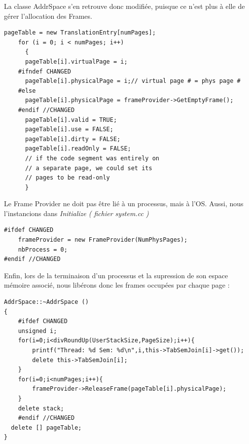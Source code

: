 \documentclass[a4paper,10pt]{article}
\begin{document}
\newpage
La classe AddrSpace s'en retrouve donc modifiée, puisque ce n'est plus à elle de gérer l'allocation des Frames.
\begin{lstlisting}[frame=single]
 pageTable = new TranslationEntry[numPages];
    for (i = 0; i < numPages; i++)
      {
	  pageTable[i].virtualPage = i;	
	#ifndef CHANGED
	  pageTable[i].physicalPage = i;// virtual page # = phys page #
	#else
	  pageTable[i].physicalPage = frameProvider->GetEmptyFrame();
	#endif //CHANGED
	  pageTable[i].valid = TRUE;
	  pageTable[i].use = FALSE;
	  pageTable[i].dirty = FALSE;
	  pageTable[i].readOnly = FALSE;
	  // if the code segment was entirely on 
	  // a separate page, we could set its 
	  // pages to be read-only
      }
\end{lstlisting}

Le Frame Provider ne doit pas être lié à un processus, mais à l'OS. Aussi, nous l'instancions dans \textit{Initialize  ( fichier system.cc )}

\begin{lstlisting}[frame=single]
 #ifdef CHANGED
    frameProvider = new FrameProvider(NumPhysPages);
    nbProcess = 0;
#endif //CHANGED
\end{lstlisting}

Enfin, lors de la terminaison d'un processus et la supression de son espace mémoire associé, nous libérons donc les frames occupées par chaque page :

\begin{lstlisting}[frame=single]
 AddrSpace::~AddrSpace ()
{
	#ifdef CHANGED
	unsigned i;
	for(i=0;i<divRoundUp(UserStackSize,PageSize);i++){
		printf("Thread: %d Sem: %d\n",i,this->TabSemJoin[i]->get());
		delete this->TabSemJoin[i];
	}
	for(i=0;i<numPages;i++){
		frameProvider->ReleaseFrame(pageTable[i].physicalPage);
	}
	delete stack;
	#endif //CHANGED
  delete [] pageTable;
}
\end{lstlisting}
\end{document}

